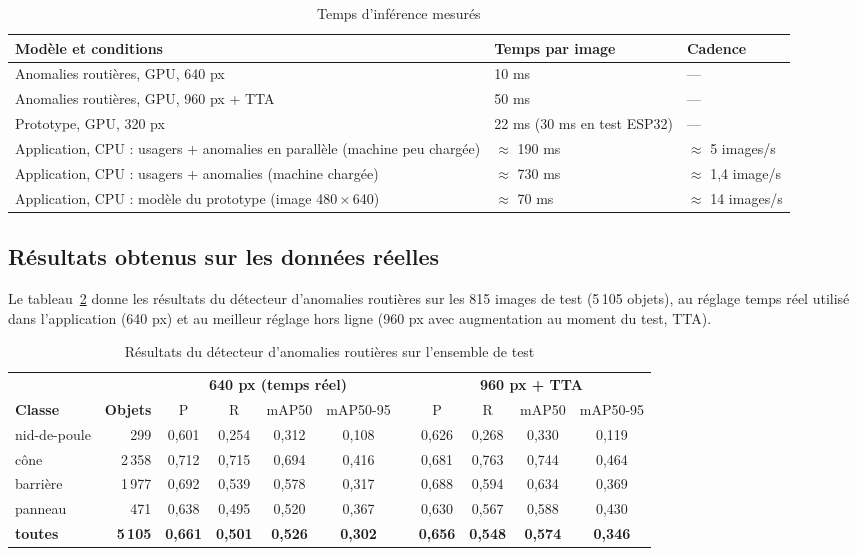 \begin{table}[H]
\centering\small
\caption{Temps d'inférence mesurés}
\label{tab:vitesse}
\begin{tabularx}{\linewidth}{X l l}
\toprule
\textbf{Modèle et conditions} & \textbf{Temps par image} & \textbf{Cadence} \\
\midrule
Anomalies routières, GPU, 640 px & 10 ms & — \\
Anomalies routières, GPU, 960 px + TTA & 50 ms & — \\
Prototype, GPU, 320 px & 22 ms (30 ms en test ESP32) & — \\
Application, CPU : usagers + anomalies en parallèle (machine peu chargée) & $\approx$ 190 ms & $\approx$ 5 images/s \\
Application, CPU : usagers + anomalies (machine chargée) & $\approx$ 730 ms & $\approx$ 1,4 image/s \\
Application, CPU : modèle du prototype (image 480\,$\times$\,640) & $\approx$ 70 ms & $\approx$ 14 images/s \\
\bottomrule
\end{tabularx}
\end{table}

\subsection{Résultats obtenus sur les données réelles}\label{sec:resultats-reels}
Le tableau~\ref{tab:res-reel} donne les résultats du détecteur d'anomalies routières sur les 815 images de test
(5\,105 objets), au réglage temps réel utilisé dans l'application (640 px) et au meilleur réglage hors ligne
(960 px avec augmentation au moment du test, TTA).

\begin{table}[H]
\centering\small
\caption{Résultats du détecteur d'anomalies routières sur l'ensemble de test}
\label{tab:res-reel}
\begin{tabular}{l r cccc c cccc}
\toprule
 & & \multicolumn{4}{c}{\textbf{640 px (temps réel)}} & & \multicolumn{4}{c}{\textbf{960 px + TTA}} \\
\cmidrule{3-6}\cmidrule{8-11}
\textbf{Classe} & \textbf{Objets} & P & R & mAP50 & mAP50-95 & & P & R & mAP50 & mAP50-95 \\
\midrule
nid-de-poule & 299  & 0,601 & 0,254 & 0,312 & 0,108 & & 0,626 & 0,268 & 0,330 & 0,119 \\
cône         & 2\,358 & 0,712 & 0,715 & 0,694 & 0,416 & & 0,681 & 0,763 & 0,744 & 0,464 \\
barrière     & 1\,977 & 0,692 & 0,539 & 0,578 & 0,317 & & 0,688 & 0,594 & 0,634 & 0,369 \\
panneau      & 471  & 0,638 & 0,495 & 0,520 & 0,367 & & 0,630 & 0,567 & 0,588 & 0,430 \\
\midrule
\textbf{toutes} & \textbf{5\,105} & \textbf{0,661} & \textbf{0,501} & \textbf{0,526} & \textbf{0,302} & &
  \textbf{0,656} & \textbf{0,548} & \textbf{0,574} & \textbf{0,346} \\
\bottomrule
\end{tabular}
\end{table}

